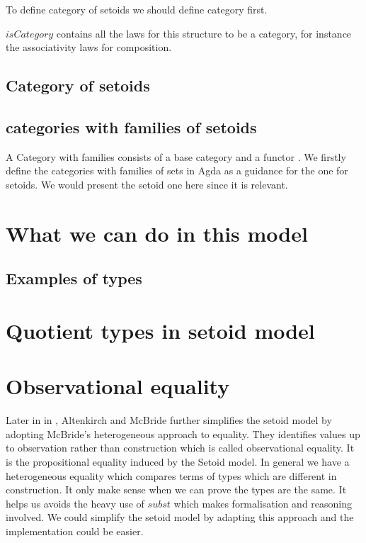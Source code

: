 To define category of setoids we should define category first.



$isCategory$ contains all the laws for this structure to be a category, for instance the
associativity laws for composition.

\subsection{Category of setoids}





\subsection{categories with families of setoids}


A Category with families consists of a base category and a functor
\cite{clairambault2005categories}. We firstly define the categories with
families of sets in Agda  as a guidance for the one for setoids. We
would present the setoid one here since it is relevant.



\section{What we can do in this model}

\subsection{Examples of types}









\section{Quotient types in setoid model}





\section{Observational equality}


Later in in \cite{alti:ott-conf}, Altenkirch and McBride further
simplifies the setoid model by adopting McBride's heterogeneous
approach to equality. They identifies values up to observation rather than
  construction which is called observational equality. It is the
  propositional equality induced by the Setoid model.  In general we have a heterogeneous equality which
  compares terms of types which are different in construction. It only
  make sense when we can prove the types are the same. It helps us
  avoids the heavy use of $subst$ which makes formalisation and
  reasoning involved. We could simplify the setoid model by adapting this
  approach and the implementation could be easier.
